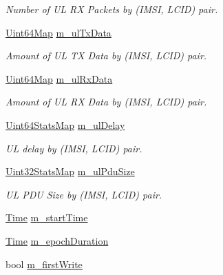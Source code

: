 \begin{DoxyCompactItemize}
\begin{DoxyCompactList}\small\item\em Number of UL RX Packets by (I\+M\+SI, L\+C\+ID) pair. \end{DoxyCompactList}\item 
\hyperlink{namespacens3_a02246d7bb546e26a989e837a36d17797}{Uint64\+Map} \hyperlink{classns3_1_1MmWaveBearerStatsCalculator_a64238f0d1136e2a8ee6df360d295e768}{m\+\_\+ul\+Tx\+Data}
\begin{DoxyCompactList}\small\item\em Amount of UL TX Data by (I\+M\+SI, L\+C\+ID) pair. \end{DoxyCompactList}\item 
\hyperlink{namespacens3_a02246d7bb546e26a989e837a36d17797}{Uint64\+Map} \hyperlink{classns3_1_1MmWaveBearerStatsCalculator_a66ba48f736e0e823583210a1c6b77046}{m\+\_\+ul\+Rx\+Data}
\begin{DoxyCompactList}\small\item\em Amount of UL RX Data by (I\+M\+SI, L\+C\+ID) pair. \end{DoxyCompactList}\item 
\hyperlink{namespacens3_a302499faee8d6f35953a73b52b34c421}{Uint64\+Stats\+Map} \hyperlink{classns3_1_1MmWaveBearerStatsCalculator_ac3b252d507793e99f05cc186abeae37d}{m\+\_\+ul\+Delay}
\begin{DoxyCompactList}\small\item\em UL delay by (I\+M\+SI, L\+C\+ID) pair. \end{DoxyCompactList}\item 
\hyperlink{namespacens3_a024aec20f35b29a93b5bfcaacf8ce269}{Uint32\+Stats\+Map} \hyperlink{classns3_1_1MmWaveBearerStatsCalculator_aa982b37ab01c0bdcd2f9182ad3c7986b}{m\+\_\+ul\+Pdu\+Size}
\begin{DoxyCompactList}\small\item\em UL P\+DU Size by (I\+M\+SI, L\+C\+ID) pair. \end{DoxyCompactList}\item 
\hyperlink{classns3_1_1Time}{Time} \hyperlink{classns3_1_1MmWaveBearerStatsCalculator_ab4b3e7ac6ccb03b3e93e0c9b197e91b2}{m\+\_\+start\+Time}
\item 
\hyperlink{classns3_1_1Time}{Time} \hyperlink{classns3_1_1MmWaveBearerStatsCalculator_a767bc28726f63f18fa581cd97c4958c4}{m\+\_\+epoch\+Duration}
\item 
bool \hyperlink{classns3_1_1MmWaveBearerStatsCalculator_a2ef640057614ee6055a0b9f559f0299b}{m\+\_\+first\+Write}
\item 

\end{DoxyCompactItemize}
